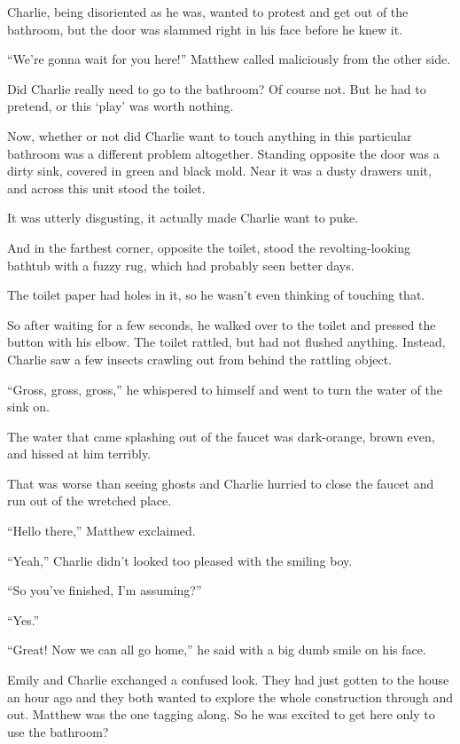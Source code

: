 Charlie, being disoriented as he was, wanted to protest and get out of the bathroom, but the door was slammed right in his face before he knew it.

“We're gonna wait for you here!” Matthew called maliciously from the other side.

Did Charlie really need to go to the bathroom? Of course not. But he had to pretend, or this ‘play' was worth nothing.

Now, whether or not did Charlie want to touch anything in this particular bathroom was a different problem altogether. Standing opposite the door was a dirty sink, covered in green and black mold. Near it was a dusty drawers unit, and across this unit stood the toilet.

It was utterly disgusting, it actually made Charlie want to puke.

And in the farthest corner, opposite the toilet, stood the revolting-looking bathtub with a fuzzy rug, which had probably seen better days.

The toilet paper had holes in it, so he wasn't even thinking of touching that.

So after waiting for a few seconds, he walked over to the toilet and pressed the button with his elbow. The toilet rattled, but had not flushed anything. Instead, Charlie saw a few insects crawling out from behind the rattling object.

“Gross, gross, gross,” he whispered to himself and went to turn the water of the sink on.

The water that came splashing out of the faucet was dark-orange, brown even, and hissed at him terribly.

That was worse than seeing ghosts and Charlie hurried to close the faucet and run out of the wretched place.

“Hello there,” Matthew exclaimed.

“Yeah,” Charlie didn't looked too pleased with the smiling boy.

“So you've finished, I'm assuming?”

“Yes.”

“Great! Now we can all go home,” he said with a big dumb smile on his face.

Emily and Charlie exchanged a confused look. They had just gotten to the house an hour ago and they both wanted to explore the whole construction through and out. Matthew was the one tagging along. So he was excited to get here only to use the bathroom?

